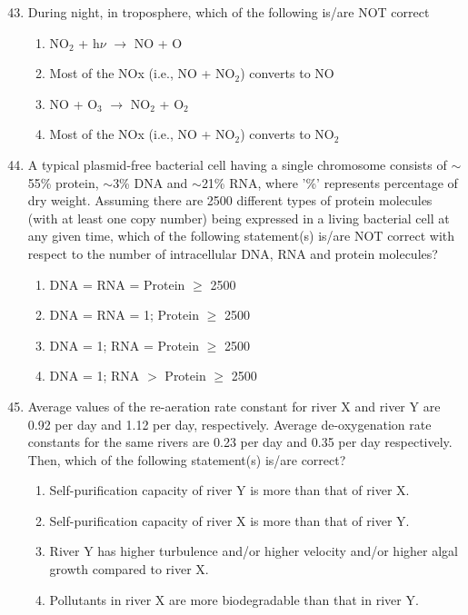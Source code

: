 \documentclass[12pt,a4paper]{article}
\begin{document}
\begin{enumerate}
   \setcounter{enumi}{42}
   \item During night, in troposphere, which of the following is/are NOT correct
         \begin{enumerate}
            \item NO$_2$ + h$\nu$ $\rightarrow$ NO + O
            \item Most of the NOx (i.e., NO + NO$_2$) converts to NO
            \item NO + O$_3$ $\rightarrow$ NO$_2$ + O$_2$
            \item Most of the NOx (i.e., NO + NO$_2$) converts to NO$_2$
         \end{enumerate}

   \item A typical plasmid-free bacterial cell having a single chromosome consists of $\sim$55\% protein, $\sim$3\% DNA and $\sim$21\% RNA, where '\%' represents percentage of dry weight. Assuming there are 2500 different types of protein molecules (with at least one copy number) being expressed in a living bacterial cell at any given time, which of the following statement(s) is/are NOT correct with respect to the number of intracellular DNA, RNA and protein molecules?
         \begin{enumerate}
            \item DNA = RNA = Protein $\geq$ 2500
            \item DNA = RNA = 1; Protein $\geq$ 2500
            \item DNA = 1; RNA = Protein $\geq$ 2500
            \item DNA = 1; RNA $>$ Protein $\geq$ 2500
         \end{enumerate}

   \item Average values of the re-aeration rate constant for river X and river Y are 0.92 per day and 1.12 per day, respectively. Average de-oxygenation rate constants for the same rivers are 0.23 per day and 0.35 per day respectively. Then, which of the following statement(s) is/are correct?
         \begin{enumerate}
            \item Self-purification capacity of river Y is more than that of river X.
            \item Self-purification capacity of river X is more than that of river Y.
            \item River Y has higher turbulence and/or higher velocity and/or higher algal growth compared to river X.
            \item Pollutants in river X are more biodegradable than that in river Y.
         \end{enumerate}


\end{enumerate}
\end{document}
